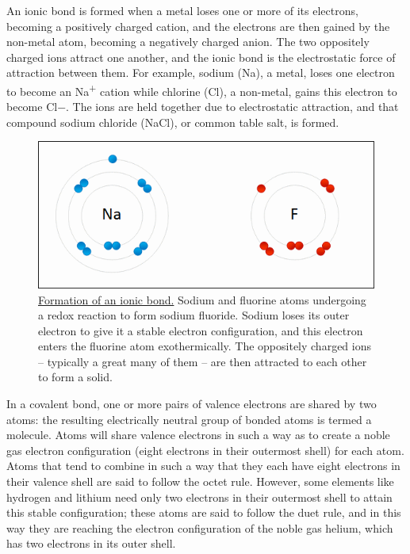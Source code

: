 An ionic bond is formed when a metal loses one or more of its electrons, becoming a positively charged cation, and the electrons are then gained by the non-metal atom, becoming a negatively charged anion. The two oppositely charged ions attract one another, and the ionic bond is the electrostatic force of attraction between them. For example, sodium (Na), a metal, loses one electron to become an Na\textsuperscript{+} cation while chlorine (Cl), a non-metal, gains this electron to become Cl−. The ions are held together due to electrostatic attraction, and that compound sodium chloride (NaCl), or common table salt, is formed.

\begin{figure}

{\centering \includegraphics[width=0.7\linewidth]{./figures/chemistry/NaF} 

}

\caption{\href{https://commons.wikimedia.org/wiki/File:NaF.gif}{Formation of an ionic bond.} Sodium and fluorine atoms undergoing a redox reaction to form sodium fluoride. Sodium loses its outer electron to give it a stable electron configuration, and this electron enters the fluorine atom exothermically. The oppositely charged ions -- typically a great many of them -- are then attracted to each other to form a solid.}\label{fig:ionicbond}
\end{figure}

In a covalent bond, one or more pairs of valence electrons are shared by two atoms: the resulting electrically neutral group of bonded atoms is termed a molecule. Atoms will share valence electrons in such a way as to create a noble gas electron configuration (eight electrons in their outermost shell) for each atom. Atoms that tend to combine in such a way that they each have eight electrons in their valence shell are said to follow the octet rule. However, some elements like hydrogen and lithium need only two electrons in their outermost shell to attain this stable configuration; these atoms are said to follow the duet rule, and in this way they are reaching the electron configuration of the noble gas helium, which has two electrons in its outer shell.

